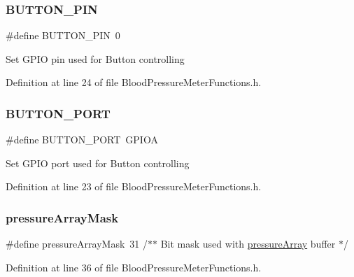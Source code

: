 \subsubsection{\texorpdfstring{BUTTON\_PIN}{BUTTON\_PIN}}
{\footnotesize\ttfamily \#define B\+U\+T\+T\+O\+N\+\_\+\+P\+IN~0}

Set G\+P\+IO pin used for Button controlling 

Definition at line 24 of file Blood\+Pressure\+Meter\+Functions.\+h.

\mbox{\label{group___blood_pressure_meter_functions_gac8ba909fc8614df64040d2e12c0780e4_gac8ba909fc8614df64040d2e12c0780e4}} 
\subsubsection{\texorpdfstring{BUTTON\_PORT}{BUTTON\_PORT}}
{\footnotesize\ttfamily \#define B\+U\+T\+T\+O\+N\+\_\+\+P\+O\+RT~G\+P\+I\+OA}

Set G\+P\+IO port used for Button controlling 

Definition at line 23 of file Blood\+Pressure\+Meter\+Functions.\+h.

\mbox{\label{group___blood_pressure_meter_functions_ga130d4bf1fba7d0a968df4eca98224c1e_ga130d4bf1fba7d0a968df4eca98224c1e}} 
\subsubsection{\texorpdfstring{pressureArrayMask}{pressureArrayMask}}
{\footnotesize\ttfamily \#define pressure\+Array\+Mask~31                 /$\ast$$\ast$ Bit mask used with \mbox{\hyperlink{group___blood_pressure_meter_functions_ga074212e81e34d1ed11bfa7238aaa15d0_ga074212e81e34d1ed11bfa7238aaa15d0}{pressure\+Array}} buffer $\ast$/}



Definition at line 36 of file Blood\+Pressure\+Meter\+Functions.\+h.

